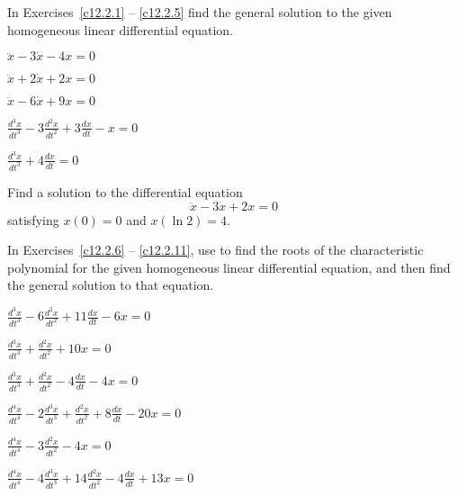 \noindent In Exercises~\ref{c12.2.1} -- \ref{c12.2.5} find the general 
solution to the given homogeneous linear differential equation.
\begin{exercise} \label{c12.2.1}
$\ddot{x}-3\dot{x}-4x = 0$
\end{exercise}
\begin{exercise} \label{c12.2.2}
$\ddot{x}+2\dot{x}+2x = 0$
\end{exercise}
\begin{exercise} \label{c12.2.3}
$\ddot{x}-6\dot{x}+9x = 0$
\end{exercise}
\begin{exercise} \label{c12.2.4}
$\frac{d^3x}{dt^3} -3\frac{d^2x}{dt^2}+3\frac{dx}{dt}-x=0$
\end{exercise}
\begin{exercise} \label{c12.2.5}
$\frac{d^3x}{dt^3}+4\frac{dx}{dt} = 0$
\end{exercise}

\begin{exercise} \label{c12.2.a6}
Find a solution to the differential equation 
\[
\ddot{x} -3\dot{x} + 2x = 0
\]
satisfying $x(0)=0$ and $x(\ln 2) = 4$.
\end{exercise}




\CEXER

\noindent In Exercises~\ref{c12.2.6} -- \ref{c12.2.11}, use \Matlab to find 
the roots of the characteristic polynomial for the given homogeneous linear 
differential equation, and then find the general solution to that equation.
\begin{exercise} \label{c12.2.6}
$\frac{d^3x}{dt^3} -6\frac{d^2x}{dt^2}+11\frac{dx}{dt}-6x=0$
\end{exercise}
\begin{exercise} \label{c12.2.7}
$\frac{d^3x}{dt^3} + \frac{d^2x}{dt^2}+ 10x=0$
\end{exercise}
\begin{exercise} \label{c12.2.8}
$\frac{d^3x}{dt^3} +\frac{d^2x}{dt^2}-4\frac{dx}{dt}-4x=0$
\end{exercise}
\begin{exercise} \label{c12.2.9}
$\frac{d^4x}{dt^4}-2\frac{d^3x}{dt^3}+\frac{d^2x}{dt^2}+8\frac{dx}{dt}-20x=0$
\end{exercise}
\begin{exercise} \label{c12.2.10}
$\frac{d^4x}{dt^4}-3\frac{d^2x}{dt^2}-4x=0$
\end{exercise}
\begin{exercise} \label{c12.2.11}
$\frac{d^4x}{dt^4}-4\frac{d^3x}{dt^3}+14\frac{d^2x}{dt^2}-4\frac{dx}{dt}+13x=0$
\end{exercise}





